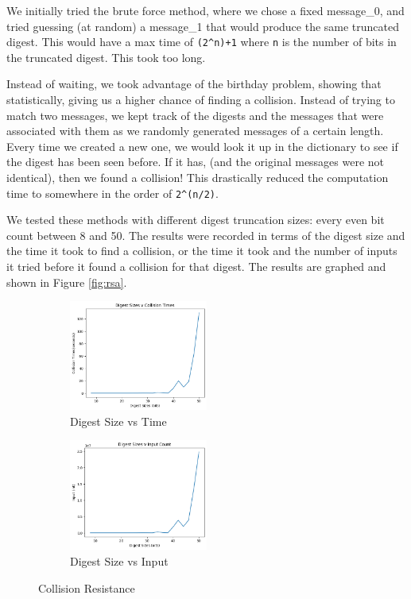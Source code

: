 \documentclass[11pt]{article}
\begin{document}
We initially tried the brute force method, where we chose a fixed message\_0, and tried guessing (at random) a message\_1 that would produce the same truncated digest. This would have a max time of \verb|(2^n)+1| where \verb|n| is the number of bits in the truncated digest. This took too long. 

Instead of waiting, we took advantage of the birthday problem, showing that statistically, giving us a higher chance of finding a collision. Instead of trying to match two messages, we kept track of the digests and the messages that were associated with them as we randomly generated messages of a certain length. Every time we created a new one, we would look it up in the dictionary to see if the digest has been seen before. If it has, (and the original messages were not identical), then we found a collision! This drastically reduced the computation time to somewhere in the order of \verb|2^(n/2)|.

We tested these methods with different digest truncation sizes: every even bit count between 8 and 50. The results were recorded in terms of the digest size and the time it took to find a collision, or the time it took and the number of inputs it tried before it found a collision for that digest. The results are graphed and shown in Figure \ref{fig:rsa}.

\begin{figure}[!ht]
	\centering
	\begin{subfigure}{1.00\textwidth}
		\centering
		\includegraphics[width=0.5\textwidth]{./assets/digest_sizes_v_collision_times.png}
		\caption{Digest Size vs Time}
		\label{fig:collision_times}
	\end{subfigure}
	\begin{subfigure}{1.00\textwidth}
		\centering
		\includegraphics[width=0.5\textwidth]{./assets/digest_sizes_v_imput_count.png}
		\caption{Digest Size vs Input}
		\label{fig:collision_inputs}
	\end{subfigure}
	\caption{Collision Resistance}
	\label{fig:collision_performance}
\end{figure}
\end{document}

